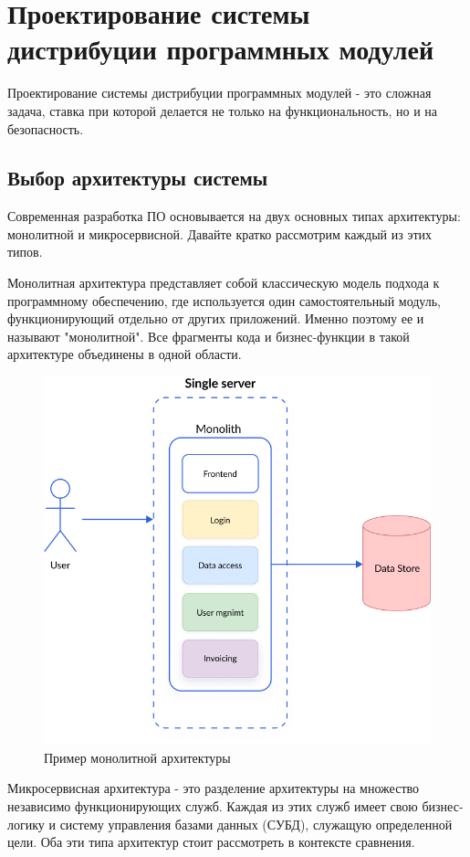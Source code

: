 \chapter{Проектирование системы дистрибуции программных модулей}
\label{cha:design}

Проектирование системы дистрибуции программных модулей - это сложная задача, ставка при которой делается не только на функциональность, но и на безопасность. 

\section{Выбор архитектуры системы}

Современная разработка ПО основывается на двух основных типах архитектуры: монолитной и микросервисной. Давайте кратко рассмотрим каждый из этих типов. 

Монолитная архитектура представляет собой классическую модель подхода к программному обеспечению, где используется один самостоятельный модуль, функционирующий отдельно от других приложений. Именно поэтому ее и называют "монолитной". Все фрагменты кода и бизнес-функции в такой архитектуре объединены в одной области.

\begin{figure}
  \centering
  \includegraphics[width=.7\textwidth]{graphics/img/mono.png}
  \caption{Пример монолитной архитектуры}
  \label{fig:mono}
\end{figure}


Микросервисная архитектура - это разделение архитектуры на множество независимо функционирующих служб. Каждая из этих служб имеет свою бизнес-логику и систему управления базами данных (СУБД), служащую определенной цели. Оба эти типа архитектур стоит рассмотреть в контексте сравнения.

